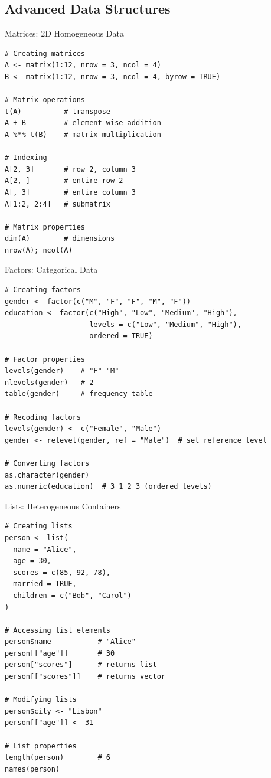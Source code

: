 \documentclass[aspectratio=169]{beamer}
\begin{document}
\subsection{Advanced Data Structures}

\begin{frame}[fragile]{Matrices: 2D Homogeneous Data}
\begin{lstlisting}
# Creating matrices
A <- matrix(1:12, nrow = 3, ncol = 4)
B <- matrix(1:12, nrow = 3, ncol = 4, byrow = TRUE)

# Matrix operations
t(A)          # transpose
A + B         # element-wise addition
A %*% t(B)    # matrix multiplication

# Indexing
A[2, 3]       # row 2, column 3
A[2, ]        # entire row 2
A[, 3]        # entire column 3
A[1:2, 2:4]   # submatrix

# Matrix properties
dim(A)        # dimensions
nrow(A); ncol(A)
\end{lstlisting}
\end{frame}

\begin{frame}[fragile]{Factors: Categorical Data}
\begin{lstlisting}
# Creating factors
gender <- factor(c("M", "F", "F", "M", "F"))
education <- factor(c("High", "Low", "Medium", "High"),
                    levels = c("Low", "Medium", "High"),
                    ordered = TRUE)

# Factor properties
levels(gender)    # "F" "M"
nlevels(gender)   # 2
table(gender)     # frequency table

# Recoding factors
levels(gender) <- c("Female", "Male")
gender <- relevel(gender, ref = "Male")  # set reference level

# Converting factors
as.character(gender)
as.numeric(education)  # 3 1 2 3 (ordered levels)
\end{lstlisting}
\end{frame}

\begin{frame}[fragile]{Lists: Heterogeneous Containers}
\begin{lstlisting}
# Creating lists
person <- list(
  name = "Alice",
  age = 30,
  scores = c(85, 92, 78),
  married = TRUE,
  children = c("Bob", "Carol")
)

# Accessing list elements
person$name           # "Alice"
person[["age"]]       # 30
person["scores"]      # returns list
person[["scores"]]    # returns vector

# Modifying lists
person$city <- "Lisbon"
person[["age"]] <- 31

# List properties
length(person)        # 6
names(person)
\end{lstlisting}
\end{frame}
\end{document}
